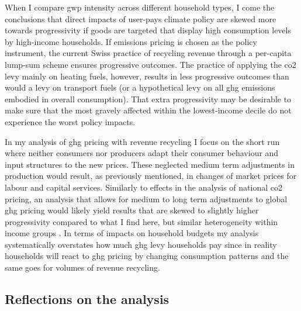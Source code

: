 \documentclass[referee, lineno, pdflatex,sn-apa]{sn-jnl}%
\theoremstyle{thmstyleone}%
\theoremstyle{thmstyletwo}%
\theoremstyle{thmstylethree}%
\begin{document}
When I compare \ac{gwp} intensity across different household types, I come the conclusions that direct impacts of user-pays climate policy are skewed more towards progressivity if goods are targeted that display high consumption levels by high-income households.
If emissions pricing is chosen as the policy instrument, the current Swiss practice of recycling revenue through a per-capita lump-sum scheme ensures progressive outcomes.
The practice of applying the \ac{co2} levy mainly on heating fuels, however, results in less progressive outcomes than would a levy on transport fuels (or a hypothetical levy on all \ac{ghg} emissions embodied in overall consumption).
That extra progressivity may be desirable to make sure that the most gravely affected within the lowest-income decile do not experience the worst policy impacts.

In my analysis of \ac{ghg} pricing with revenue recycling I focus on the short run where neither consumers nor producers adapt their consumer behaviour and input structures to the new prices.
These neglected medium term adjustments in production would result, as previously mentioned, in changes of market prices for labour and capital services.
Similarly to effects in the analysis of national \ac{co2} pricing, an analysis that allows for medium to long term adjustments to global \ac{ghg} pricing would likely yield results that are skewed to slightly higher progressivity compared to what I find here, but similar heterogeneity within income groups \citep[compare to findings by][]{rausch_distributional_2011, landis_cost_2019}.
In terms of impacts on household budgets my analysis systematically overstates how much \ac{ghg} levy households pay since in reality households will react to \ac{ghg} pricing by changing consumption patterns and the same goes for volumes of revenue recycling.

\subsection{Reflections on the analysis}
\label{sec:reflections}
\end{document}
